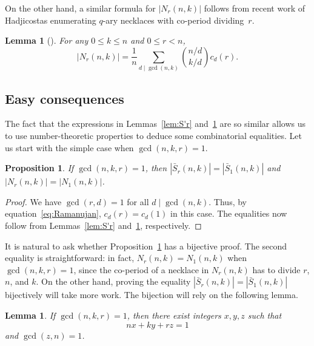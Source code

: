 \documentclass[12pt]{article}
\newcommand{\card}[1]{\left|#1\right|}
\newcommand{\bS}{\bar{S}}
\newtheorem{proposition}[theorem]{Proposition}
\newtheorem{lemma}[theorem]{Lemma}
\theoremstyle{definition}
\begin{document}
On the other hand, a similar formula for $\card{N_r(n, k)}$ follows from recent work of Hadjicostas \cite[Thm.~1]{hadji-necklaces} enumerating $q$-ary necklaces with co-period dividing~$r$.

\begin{lemma}[\cite{hadji-necklaces}]\label{lem:Nr}
    For any $0\le k\le n$ and $0\le r< n$,
    \[
        \card{N_r(n, k)} = \frac{1}{n} \sum_{d \mid \gcd(n, k)} {n/d \choose k/d} c_d(r).
    \]
\end{lemma}

\subsection{Easy consequences}
The fact that the expressions in Lemmas~\ref{lem:S'r} and~\ref{lem:Nr} are so similar allows us to use number-theoretic properties to deduce some
combinatorial equalities.
Let us start with the simple case when $\gcd(n, k, r) = 1$. 

\begin{proposition}\label{prop:gcd=1}
    If $\gcd(n, k, r) = 1$, then $\card{\bS_r(n, k)} = \card{\bS_1(n, k)}$ and $\card{N_r(n, k)} = \card{N_1(n, k)}$. 
\end{proposition}

\begin{proof}
    We have $\gcd(r, d) = 1$ for all $d \mid \gcd(n, k)$. Thus, by equation~\eqref{eq:Ramanujan}, $c_d(r) = c_d(1)$ in this case. The equalities now follow from Lemmas~\ref{lem:S'r} and~\ref{lem:Nr}, respectively. 
\end{proof}

It is natural to ask whether Proposition~\ref{prop:gcd=1} has a bijective proof.
The second equality is straightforward: in fact, $N_r(n, k)= N_1(n, k)$ when $\gcd(n, k, r) = 1$, since the co-period of a necklace in $N_r(n, k)$ has to divide $r$, $n$, and $k$. On the other hand, proving the equality $\card{\bS_r(n, k)} = \card{\bS_1(n, k)}$ bijectively will take more work. The bijection will rely on the following lemma. 

\begin{lemma}\label{lem:Bezout}
    If $\gcd(n, k, r) = 1$, then there exist integers $x, y, z$ such that
    \begin{equation}\label{eq:Bezout}
        nx + ky + rz = 1
    \end{equation}
    and $\gcd(z, n) = 1$.
\end{lemma}
\end{document}
